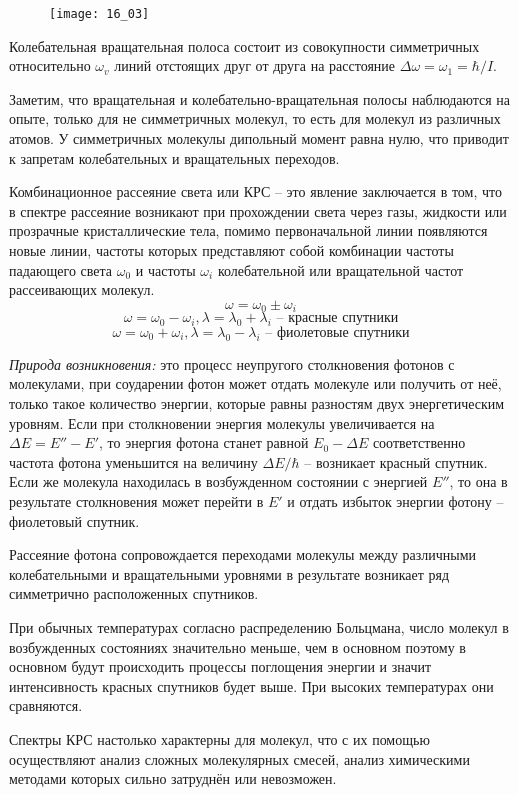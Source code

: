 \begin{figure}[h!]
    \center
    \texttt{[image: 16\_03]}
\end{figure}

Колебательная вращательная полоса состоит из совокупности симметричных 
относительно \( \omega_v \) линий отстоящих друг от друга на расстояние 
\( \Delta\omega = \omega_1 = \hbar/I \).

Заметим, что вращательная и колебательно-вращательная полосы наблюдаются 
на опыте, только для не симметричных молекул, то есть для молекул из 
различных атомов. У симметричных молекулы дипольный момент равна нулю, 
что приводит к запретам колебательных и вращательных переходов.

Комбинационное рассеяние света или КРС -- это явление заключается в том, 
что в спектре рассеяние возникают при прохождении света через газы, 
жидкости или прозрачные кристаллические тела, помимо первоначальной линии 
появляются новые линии, частоты которых представляют собой комбинации 
частоты падающего света \( \omega_0 \) и частоты \( \omega_i \) 
колебательной или вращательной частот рассеивающих молекул.
\[ \omega = \omega_0 \pm \omega_i \]
\[ 
    \omega = \omega_0 - \omega_i, \lambda = \lambda_0 + \lambda_i 
    \text{ -- красные спутники}
\]
\[ 
    \omega = \omega_0 + \omega_i, \lambda = \lambda_0 - \lambda_i
    \text{ -- фиолетовые спутники}
\]

\emph{Природа возникновения: } это процесс неупругого столкновения фотонов 
с молекулами, при соударении фотон может отдать молекуле или получить от 
неё, только такое количество энергии, которые равны разностям двух 
энергетическим уровням. Если при столкновении энергия молекулы 
увеличивается на \( \Delta E = E'' - E' \), то энергия фотона станет 
равной \( E_0 - \Delta E \) соответственно частота фотона уменьшится на 
величину \( \Delta E / \hbar \) -- возникает красный спутник. Если же 
молекула находилась в возбужденном состоянии с энергией \( E'' \), то 
она в результате столкновения может перейти в \( E' \) и отдать избыток 
энергии фотону -- фиолетовый спутник.

Рассеяние фотона сопровождается переходами молекулы между различными 
колебательными и вращательными уровнями в результате возникает ряд 
симметрично расположенных спутников. 

При обычных температурах согласно распределению Больцмана, число молекул 
в возбужденных состояниях значительно меньше, чем в основном поэтому в 
основном будут происходить процессы поглощения энергии и значит 
интенсивность красных спутников будет выше. При высоких температурах 
они сравняются.

Спектры КРС настолько характерны для молекул, что с их помощью осуществляют 
анализ сложных молекулярных смесей, анализ химическими методами 
которых сильно затруднён или невозможен.

\newpage
